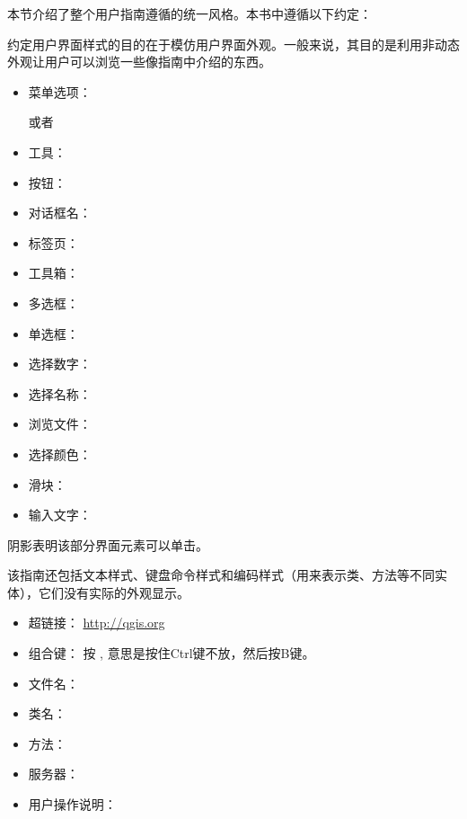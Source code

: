 \label{label_conventions}

本节介绍了整个用户指南遵循的统一风格。本书中遵循以下约定：


约定用户界面样式的目的在于模仿用户界面外观。一般来说，其目的是利用非动态外观让用户可以浏览一些像指南中介绍的东西。

\begin{itemize}[label=--,itemsep=5pt]
\item 菜单选项：  \arrow
{}

或者

 \arrow
{} \arrow {}
\item 工具： 
\item 按钮： 
\item 对话框名： 
\item 标签页： 

\item 工具箱： 
\item 多选框： 
\item 单选框：   
\item 选择数字： 
\item 选择名称： 
\item 浏览文件： \browsebutton
\item 选择颜色： 
\item 滑块： 
\item 输入文字： 
\end{itemize}
阴影表明该部分界面元素可以单击。


该指南还包括文本样式、键盘命令样式和编码样式（用来表示类、方法等不同实体），它们没有实际的外观显示。

\begin{itemize}[label=--]
\item 超链接： \url{http://qgis.org}
\item 组合键： 按 , 意思是按住Ctrl键不放，然后按B键。
\item 文件名： 
\item 类名： 
\item 方法： 
\item 服务器： 
\item 用户操作说明： 
\end{itemize}

